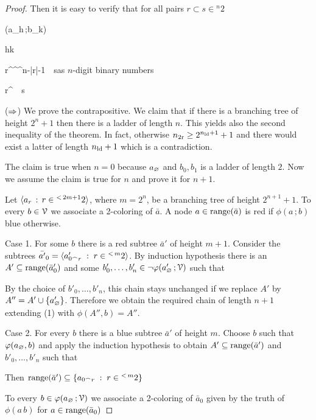 \documentclass[scombinatorics.tex]{subfiles}
\begin{document}
\begin{proof}
  Then it is easy to verify that for all pairs $r\subset s\in{}^n2$

  {\IFF}
  {\phi(a_h\,;b_k)}

  \ceq{}
  {\IFF}
  {h\le k}

  \ceq{}
  {\IFF}
  {r^^^{n-|r|-1}\ \le\ s}\hfill  as $n$-digit binary numbers

  \ceq{}
  {\IFF}
  {r^\ \subseteq\ s}

  ($\Rightarrow$)
  We prove the contrapositive.
  We claim that if there is a branching tree of height $2^n+1$ then there is a ladder of length $n$.
  This yields also the second inequality of the theorem.
  In fact, otherwise $n_{\rm 2r}\ge 2^{n_{\rm ld}+1}+1$ and there would exist a latter of length $n_{\rm ld}+1$ which is a contradiction.

  The claim is true when $n=0$ because $a_\varnothing$ and $b_0,b_1$ is a ladder of length $2$.
  Now we assume the claim is true for $n$ and prove it for $n+1$.

  Let $\langle a_r\, :\, r\in{}^{<\, 2m+1}2\rangle$, where $m=2^n$, be a branching tree of height $2^{n+1}+1$.
  To every $b\in\EuScript V$ we associate a 2-coloring of $\bar a$.
  A node $a\in\mathop{\rm range}(\bar a)$ is red if $\phi(a\,;b)$ blue otherwise.

  Case 1. For some $b$ there is a red subtree $\bar a'$ of height $m+1$.
  Consider the subtrees $\bar{a'}_0=\langle a'_{0^\frown r}\;:\;r\in {}^{<\,m}2\rangle$.
  By induction hypothesis there is an $A'\subseteq\mathop{\rm range}(\bar a'_0)$ and some $b'_0,\dots,b'_n\in\neg\varphi(a'_\varnothing\,;\EuScript V)$ such that


  By the choice of $b'_0,\dots,b'_n$, this chain stays unchanged if we replace $A'$ by $A''=A'\cup\{a'_\varnothing\}$.
  Therefore we obtain the required chain of length $n+1$ extending (1) with $\phi(A'',b)=A''$.
  
  Case 2. For every $b$ there is a blue subtree $\bar a'$ of height $m$.
  Choose $b$ such that $\varphi(a_\varnothing, b)$ and apply the induction hypothesis to obtain $A'\subseteq\mathop{\rm range}(\bar a')$ and $b'_0,\dots,b'_n$ such that


  
  Then $\mathop{\rm range}(\bar a')\subseteq\{a_{0^\frown r}\;:\;r\in {}^{<\,m}2\}$ 

  To every $b\in\varphi(a_\varnothing\,;\EuScript V)$ we associate a 2-coloring of $\bar a_0$ given by the truth of $\phi(a\,b)$ for $a\in\mathop{\rm range}(\bar a_0)$
  

\end{proof}
\end{document}
